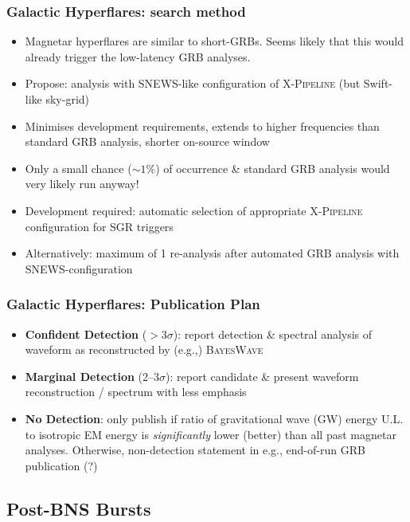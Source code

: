 \documentclass{beamer}
\def\gw#1{gravitational wave#1 (GW#1)\gdef\gw{GW}}
\begin{document}
\begin{frame}
    \frametitle{Galactic Hyperflares: search method}
    \begin{itemize}
        \item Magnetar hyperflares are similar to short-GRBs.  Seems likely that
            this would already trigger the low-latency GRB analyses.
        \item Propose: analysis with SNEWS-like configuration of
            \textsc{X-Pipeline} (but Swift-like sky-grid)
        \item Minimises development requirements, extends to higher frequencies
            than standard GRB analysis, shorter on-source window
        \item Only a small chance ($\sim 1\%$) of occurrence \& standard GRB
            analysis would very likely run anyway! 
        \item Development required: automatic selection of appropriate
            \textsc{X-Pipeline} configuration for SGR triggers
        \item Alternatively: maximum of 1 re-analysis after automated GRB
            analysis with SNEWS-configuration
    \end{itemize}
\end{frame}

\begin{frame}
    \frametitle{Galactic Hyperflares: Publication Plan}
    \begin{itemize}
        \item {\bf Confident Detection} ($>3\sigma$): report detection \&
            spectral analysis of waveform as reconstructed by (e.g.,)
            \textsc{BayesWave}
        \item {\bf Marginal Detection} (2--3$\sigma$): report candidate \&
            present waveform reconstruction / spectrum with less emphasis
        \item {\bf No Detection}: only publish if ratio of \gw{} energy U.L. to
            isotropic EM energy is \emph{significantly} lower (better) than all
            past magnetar analyses.  Otherwise, non-detection statement in e.g.,
            end-of-run GRB publication (?)
    \end{itemize}
\end{frame}

\subsection{Post-BNS Bursts}
\end{document}
